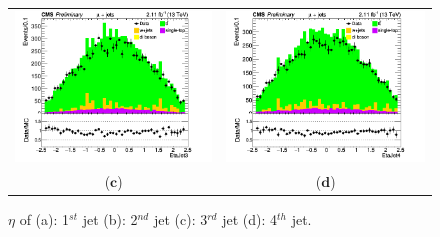 \documentclass{cmspaper}
\begin{document}
\begin{figure}[htp]
\begin{tabular}{cc}
\includegraphics[scale=0.40]{results/EtaJet3.png}
& \hspace{-0.5cm} \includegraphics[scale=0.40]{results/EtaJet4.png}\\
   ($\mathbf{c}$)\qquad\qquad&($\mathbf{d}$)\qquad\qquad\qquad\\
\end{tabular}
\caption{$\eta$ of (a): 1$^{st}$ jet (b): 2$^{nd}$ jet (c): 3$^{rd}$ jet (d): 4$^{th}$ jet.}\label{etas_jets}
\end{figure}
\end{document}
